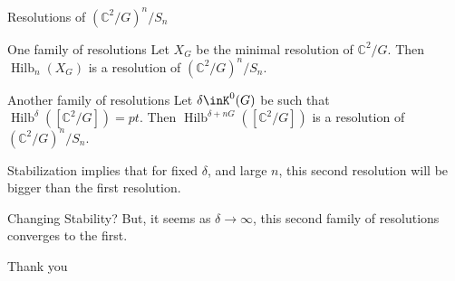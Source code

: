 \documentclass{beamer}
\DeclareMathOperator{\Hilb}{Hilb}
\newcommand{\C}{\mathbb{C}}
\begin{document}
\begin{frame}{Resolutions of $(\C^2/G)^n/S_n$}
\begin{block}{One family of resolutions}
Let $X_G$ be the minimal resolution of $\C^2/G$.  Then $\Hilb_n(X_G)$ is a resolution of $(\C^2/G)^n/S_n$.
\end{block}

\begin{block}{Another family of resolutions}
Let $\delta\inK^0(G)$ be such that $\Hilb^\delta([\C^2/G])=pt$.  Then $\Hilb^{\delta+nG}([\C^2/G])$ is a resolution of $(\C^2/G)^n/S_n$.  
\end{block}


Stabilization implies that for fixed $\delta$, and large $n$, this second resolution will be bigger than the first resolution.

\begin{block}{Changing Stability?}
But, it seems as $\delta\to\infty$, this second family of resolutions converges to the first.
\end{block}
\end{frame}

\begin{frame}[plain,c]
 
\begin{center}

\Huge

Thank you

\end{center}

\end{frame}
\end{document}
